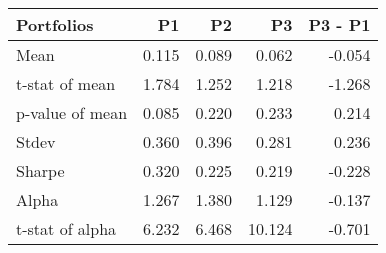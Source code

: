 \begin{tabular}{lrrrr}
\toprule
Portfolios & P1 & P2 & P3 & P3 - P1 \\
\midrule
Mean & 0.115 & 0.089 & 0.062 & -0.054 \\
t-stat of mean & 1.784 & 1.252 & 1.218 & -1.268 \\
p-value of mean & 0.085 & 0.220 & 0.233 & 0.214 \\
Stdev & 0.360 & 0.396 & 0.281 & 0.236 \\
Sharpe & 0.320 & 0.225 & 0.219 & -0.228 \\
Alpha & 1.267 & 1.380 & 1.129 & -0.137 \\
t-stat of alpha & 6.232 & 6.468 & 10.124 & -0.701 \\
\bottomrule
\end{tabular}
